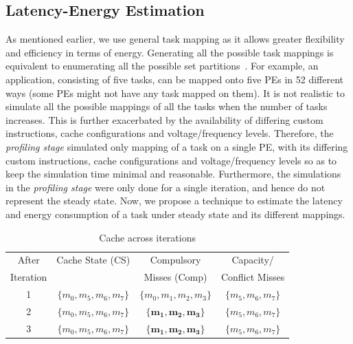 \subsection{Latency-Energy Estimation}

As mentioned earlier, we use general task mapping as it allows greater
flexibility and efficiency in terms of energy. Generating all the possible task mappings
is equivalent to enumerating all the possible set partitions~\cite{}.
For example, an application, consisting of five tasks, can be mapped
onto five PEs in 52 different ways (some PEs might not have any task
mapped on them). It is not realistic to simulate all the possible
mappings of all the tasks when the number of tasks increases. This is
further exacerbated by the availability of differing custom instructions,
cache configurations and voltage/frequency levels. Therefore, the
\textit{profiling stage} simulated only mapping of a task on a single
PE, with its differing custom instructions, cache configurations and
voltage/frequency levels so as to keep the simulation time minimal
and reasonable. Furthermore, the simulations in the \textit{profiling
stage} were only done for a single iteration, and hence do not represent
the steady state. Now, we propose a technique to estimate the latency
and energy consumption of a task under steady state and its different
mappings.
\begin{center}
\begin{table}\scriptsize
\begin{tabular}{|c|c|c|c|}
\hline
After & Cache State (CS) & Compulsory  & Capacity/ \\
Iteration & & Misses (Comp) & Conflict Misses \\
\hline 
1 & $\lbrace m_0,m_5,m_6,m_7 \rbrace$ & $\lbrace m_0,m_1,m_2,m_3\rbrace$ & $\lbrace m_5,m_6,m_7\rbrace$ \\
\hline 
2 & $\lbrace m_0,m_5,m_6,m_7 \rbrace$ & $\boldsymbol{\lbrace m_1,m_2,m_3\rbrace}$ & $\lbrace m_5,m_6,m_7\rbrace$ \\
\hline
3 & $\lbrace m_0,m_5,m_6,m_7 \rbrace$ & $\boldsymbol{\lbrace m_1,m_2,m_3\rbrace}$ & $\lbrace m_5,m_6,m_7\rbrace$ \\
\hline
\end{tabular}
\caption{Cache across iterations}
\label{tab:c_iter}
\end{table}
\end{center}

